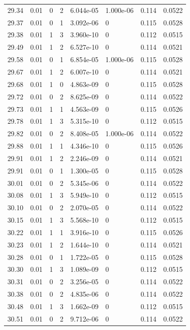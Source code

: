 \documentclass[preview]{standalone}
\begin{document}
{{{{{{{{{{{{\begin{tabular}{L{1.2cm}C{1.2cm} C{0.3cm}C{0.5cm} C{1.4cm}C{1.4cm} C{1.4cm}C{1.4cm}}
  29.34  &  0.01  & 0     &  2 &  6.044e-05  & 1.000e-06  & 0.114 &  0.0522   \\ 
  29.37  &  0.01  & 0     &  1 &  3.092e-06  & 0  & 0.115 &  0.0528   \\ 
  29.38  &  0.01  & 1     &  3 &  3.960e-10  & 0  & 0.112 &  0.0515   \\ 
  29.49  &  0.01  & 1     &  2 &  6.527e-10  & 0  & 0.114 &  0.0521   \\ 
  29.58  &  0.01  & 0     &  1 &  6.854e-05  & 1.000e-06  & 0.115 &  0.0528   \\ 
  29.67  &  0.01  & 1     &  2 &  6.007e-10  & 0  & 0.114 &  0.0521   \\ 
  29.68  &  0.01  & 1     &  0 &  4.863e-09  & 0  & 0.115 &  0.0528   \\ 
  29.72  &  0.01  & 0     &  2 &  8.625e-09  & 0  & 0.114 &  0.0522   \\ 
  29.73  &  0.01  & 1     &  1 &  4.563e-09  & 0  & 0.115 &  0.0526   \\ 
  29.78  &  0.01  & 1     &  3 &  5.315e-10  & 0  & 0.112 &  0.0515   \\ 
  29.82  &  0.01  & 0     &  2 &  8.408e-05  & 1.000e-06  & 0.114 &  0.0522   \\ 
  29.88  &  0.01  & 1     &  1 &  4.346e-10  & 0  & 0.115 &  0.0526   \\ 
  29.91  &  0.01  & 1     &  2 &  2.246e-09  & 0  & 0.114 &  0.0521   \\ 
  29.91  &  0.01  & 0     &  1 &  1.300e-05  & 0  & 0.115 &  0.0528   \\ 
  30.01  &  0.01  & 0     &  2 &  5.345e-06  & 0  & 0.114 &  0.0522   \\ 
  30.08  &  0.01  & 1     &  3 &  5.949e-10  & 0  & 0.112 &  0.0515   \\ 
  30.10  &  0.01  & 0     &  2 &  2.070e-05  & 0  & 0.114 &  0.0522   \\ 
  30.15  &  0.01  & 1     &  3 &  5.568e-10  & 0  & 0.112 &  0.0515   \\ 
  30.22  &  0.01  & 1     &  1 &  3.916e-10  & 0  & 0.115 &  0.0526   \\ 
  30.23  &  0.01  & 1     &  2 &  1.644e-10  & 0  & 0.114 &  0.0521   \\ 
  30.28  &  0.01  & 0     &  1 &  1.722e-05  & 0  & 0.115 &  0.0528   \\ 
  30.30  &  0.01  & 1     &  3 &  1.089e-09  & 0  & 0.112 &  0.0515   \\ 
  30.31  &  0.01  & 0     &  2 &  3.256e-05  & 0  & 0.114 &  0.0522   \\ 
  30.38  &  0.01  & 0     &  2 &  4.835e-06  & 0  & 0.114 &  0.0522   \\ 
  30.48  &  0.01  & 1     &  3 &  1.662e-09  & 0  & 0.112 &  0.0515   \\ 
  30.51  &  0.01  & 0     &  2 &  9.712e-06  & 0  & 0.114 &  0.0522   \\ 
\hline 
\end{tabular} 

}}}}}}}}}}}}
\end{document}

